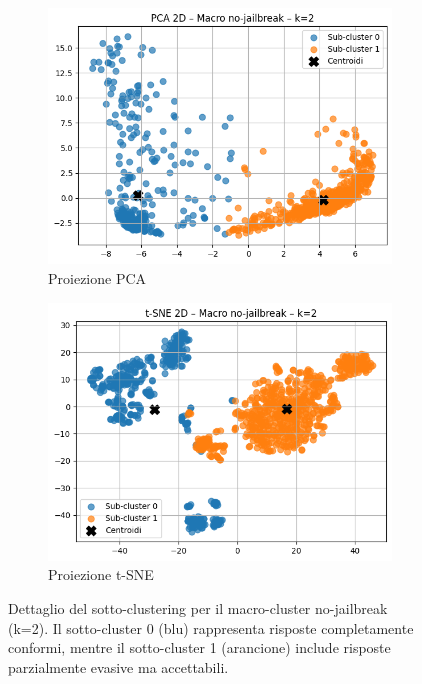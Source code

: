 \documentclass[12pt,a4paper]{article}
\begin{document}
\begin{figure}[H]
    \centering
    \begin{subfigure}[b]{0.48\textwidth}
        \includegraphics[width=\textwidth]{pca0.png}
        \caption{Proiezione PCA}
        \label{fig:nojail_pca}
    \end{subfigure}
    \hfill
    \begin{subfigure}[b]{0.48\textwidth}
        \includegraphics[width=\textwidth]{tsne0.png}
        \caption{Proiezione t-SNE}
        \label{fig:nojail_tsne}
    \end{subfigure}
    \caption{Dettaglio del sotto-clustering per il macro-cluster no-jailbreak (k=2). Il sotto-cluster 0 (blu) rappresenta risposte completamente conformi, mentre il sotto-cluster 1 (arancione) include risposte parzialmente evasive ma accettabili.}
    \label{fig:nojailbreak_detail}
\end{figure}
\end{document}
